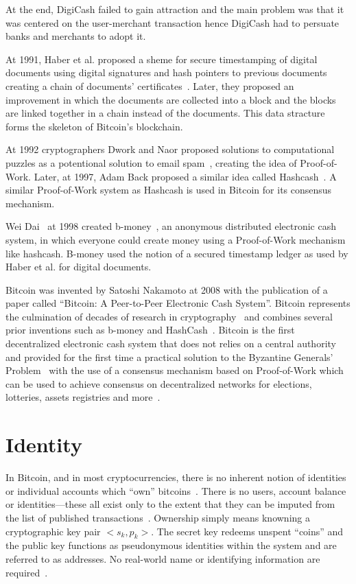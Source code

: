 At the end, DigiCash failed to gain attraction and the main problem was that it was centered on the user-merchant transaction hence
DigiCash had to persuate banks and merchants to adopt it.

At 1991, Haber et al. proposed a sheme for secure timestamping of digital documents using digital signatures and hash pointers to previous documents
creating a chain of documents' certificates~\cite{Haber1991}. Later, they proposed an improvement in which the documents are collected into a block and
the blocks are linked together in a chain instead of the documents. This data stracture forms the skeleton of Bitcoin's blockchain.

At 1992 cryptographers Dwork and Naor proposed solutions to computational puzzles as a potentional solution to email spam~\cite{Dwork1993},
creating the idea of Proof-of-Work. Later, at 1997, Adam Back proposed a similar idea called Hashcash~\cite{hash_cash}.
A similar Proof-of-Work system as Hashcash is used in Bitcoin for its consensus mechanism.

Wei Dai~\cite{bitcoin_wiki:wei_dai} at 1998 created b-money~\cite{bitcoin_wiki:b_money}, an anonymous distributed electronic cash system, in which everyone
could create money using a Proof-of-Work mechanism like hashcash. B-money used the notion of a secured timestamp ledger as used by Haber et al. for digital documents.

Bitcoin was invented by Satoshi Nakamoto at 2008 with the publication of a paper called ``Bitcoin: A Peer-to-Peer Electronic Cash System''.
Bitcoin represents the culmination of decades of research in cryptography~\cite{antonopoulos2014mastering} and combines several prior inventions
such as b-money and HashCash~\cite{antonopoulos2014mastering}. Bitcoin is the first decentralized electronic cash system that does not relies on a central authority and
provided for the first time a practical solution to the Byzantine Generals' Problem~\cite{wiki:byzantine_fault_tolerance} with the use of a consensus mechanism
based on Proof-of-Work which can be used to achieve consensus on decentralized networks for elections, lotteries, assets registries and more~\cite{antonopoulos2014mastering}.

\section{Identity}\label{blockchain:identity}

In Bitcoin, and in most cryptocurrencies, there is no inherent notion of identities or individual accounts which “own” bitcoins~\cite{7163021,nakamoto2012bitcoin}.
There is no users, account balance or identities—these all exist only to the extent that they can be imputed from the list of published transactions~\cite{7163021,nakamoto2012bitcoin}.
Ownership simply means knowning a cryptographic key pair $<s_k, p_k>$. The secret key redeems unspent “coins” and the public key functions as pseudonymous
identities within the system and are referred to as addresses. No real-world name or identifying information are required~\cite{7163021,nakamoto2012bitcoin}.

